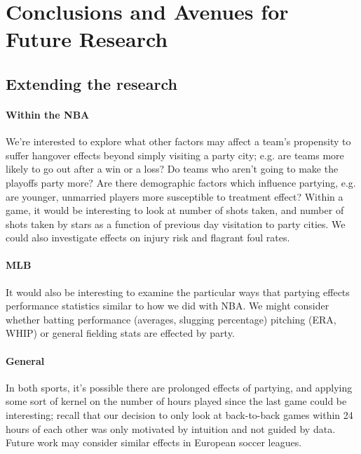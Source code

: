 \documentclass[letterpaper,12pt]{article}
\begin{document}
\section{Conclusions and Avenues for Future Research}
\subsection{Extending the research}
\paragraph{Within the NBA} 
We're interested to explore what other factors may affect a team's propensity to suffer hangover effects beyond simply visiting a party city; e.g. are teams more likely to go out after
a win or a loss? Do teams who aren't going to make the playoffs party more? Are there demographic
factors which influence partying, e.g. are younger, unmarried players more susceptible to treatment effect? Within a game, it would be interesting to look at 
number of shots taken, and number of shots taken by 
stars as a function of previous day visitation to party cities. We could also investigate 
effects on injury risk and flagrant foul rates.

\paragraph{MLB}
It would also be interesting to examine the particular ways that partying
effects performance statistics similar to how we did with NBA.
We might consider whether batting performance (averages, slugging percentage)
pitching (ERA, WHIP) or general fielding stats are effected by party.

\paragraph{General}
In both sports, it's possible there are prolonged effects of partying, and applying some sort of kernel on the number of hours played since the last game could be interesting; recall that our decision to only look at back-to-back games 
within 24 hours of each other was only motivated by intuition and not guided by data. 
Future work may consider similar effects in European soccer leagues.
\end{document}
